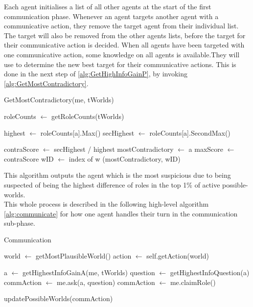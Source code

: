 \setcounter{algorithmcaption}{3}
Each agent initialises a list of all other agents at the
start of the first communication phase. Whenever an agent targets another agent
with a communicative action, they remove the target agent from their individual
list. The target will also be removed from the other agents lists, before the target for their communicative action is decided. When all agents have been targeted with one communicative action, some knowledge on all agents is available.They will use to determine
the new best target for their communicative
actions. This is done in the next step of \cref{alg:GetHighInfoGainP},
by invoking \cref{alg:GetMostContradictory}.
\begin{algorithm}[H]
	\caption{GetMostContradictory(me, tWorlds)}
	\begin{algorithmic}[1]
		\State roleCounts $\gets$ getRoleCounts(tWorlds)

		\State highest $\gets$ roleCounts[a].Max()
		\State secHighest $\gets$ roleCounts[a].SecondMax()

		\State contraScore $\gets$ secHighest / highest
		\State mostContradictory $\gets$ a
		\State maxScore $\gets$ contraScore
		\State wID $\gets$ index of w
		\EndIf
		\EndFor
		\EndFor
		\State \Return (mostContradictory, wID)
	\end{algorithmic}\label{alg:GetMostContradictory}
\end{algorithm}
\setcounter{algorithmcaption}{4}
This algorithm outputs the agent which is the most suspicious due to being
suspected of being the highest difference of roles in the top 1\% of active possible-worlds.\\
This whole process is described in the following high-level algorithm
\ref{alg:communicate} for how one agent handles their turn in the communication
sub-phase.
\begin{algorithm}[H]
	\caption{Communication}
	\begin{algorithmic}[1]
		\State world $\gets$ getMostPlausibleWorld()
		\State action $\gets$ self.getAction(world)

		\State a $\gets$ getHighestInfoGainA(me, tWorlds)
		\State question $\gets$ getHighestInfoQuestion(a)
		\State commAction $\gets$ me.ask(a, question)
		\State commAction $\gets$ me.claimRole()
		\EndIf

		\State updatePossibleWorlds(commAction)
		\EndFunction
	\end{algorithmic}\label{alg:communicate}
\end{algorithm}
